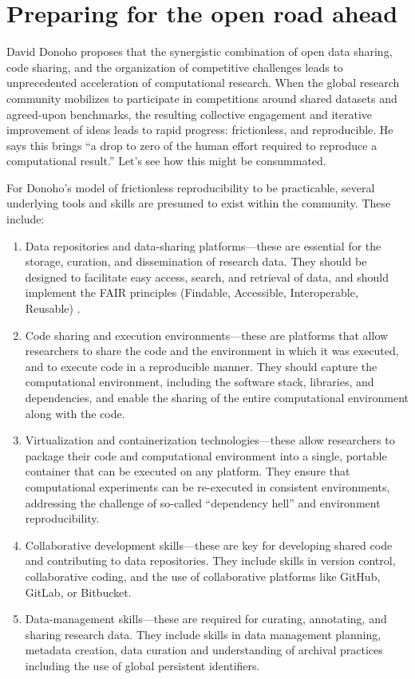 \documentclass[]{hdsr}
\begin{document}
\section*{Preparing  for the open road ahead}

David Donoho proposes that the synergistic combination of open data sharing, code sharing, and the organization of competitive challenges leads to unprecedented acceleration of computational research. When the global research community mobilizes to participate in competitions around shared datasets and agreed-upon benchmarks, the resulting collective engagement and iterative improvement of ideas leads to rapid progress: frictionless, and reproducible. He says this brings ``a drop to zero of the human effort required to reproduce a computational result.'' Let's see how this might be consummated.

For Donoho's model of frictionless reproducibility to be practicable, several underlying tools and skills are presumed to exist within the community. These include:

\begin{enumerate}
    \item Data repositories and data-sharing platforms---these are essential for the storage, curation, and dissemination of research data. They should be designed to facilitate easy access, search, and retrieval of data, and should implement the FAIR principles (Findable, Accessible, Interoperable, Reusable) \citep{wilkinson2016fair}.
    \item Code sharing and execution environments---these are platforms that allow researchers to share the code and the environment in which it was executed, and to execute code in a reproducible manner. They should capture the computational environment, including the software stack, libraries, and dependencies, and enable the sharing of the entire computational environment along with the code.
    \item Virtualization and containerization technologies---these allow researchers to package their code and computational environment into a single, portable container that can be executed on any platform. They ensure that computational experiments can be re-executed in consistent environments, addressing the challenge of so-called ``dependency hell'' and environment reproducibility.
    \item Collaborative development skills---these are key for developing shared code and contributing to data repositories. They include skills in version control, collaborative coding, and the use of collaborative platforms like GitHub, GitLab, or Bitbucket.
    \item Data-management skills---these are required for curating, annotating, and sharing research data. They include skills in data management planning, metadata creation, data curation and understanding of archival practices including the use of global persistent identifiers.
\end{enumerate}
\end{document}
